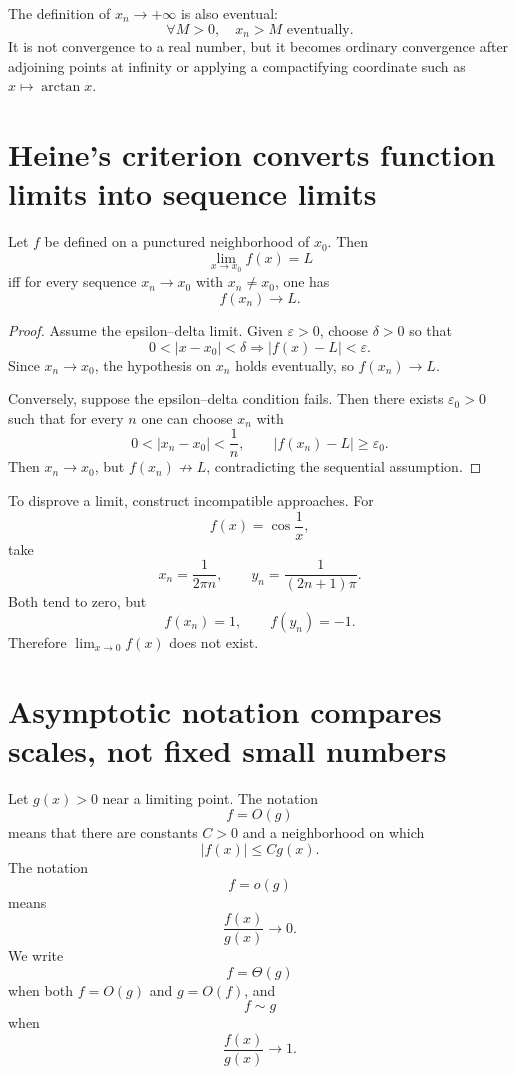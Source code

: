 The definition of \(x_n\to+\infty\) is also eventual:
\[
  \forall M>0,
  \quad
  x_n>M\text{ eventually}.
\]
It is not convergence to a real number, but it becomes ordinary convergence after adjoining points at infinity or applying a compactifying coordinate such as \(x\mapsto\arctan x\).

\section{Heine's criterion converts function limits into sequence limits}

\begin{theorem}
Let \(f\) be defined on a punctured neighborhood of \(x_0\).  Then
\[
  \lim_{x\to x_0}f(x)=L
\]
iff for every sequence \(x_n\to x_0\) with \(x_n\ne x_0\), one has
\[
  f(x_n)\to L.
\]
\end{theorem}

\begin{proof}
Assume the epsilon--delta limit.  Given \(\varepsilon>0\), choose \(\delta>0\) so that
\[
  0<|x-x_0|<\delta
  \Longrightarrow
  |f(x)-L|<\varepsilon.
\]
Since \(x_n\to x_0\), the hypothesis on \(x_n\) holds eventually, so \(f(x_n)\to L\).

Conversely, suppose the epsilon--delta condition fails.  Then there exists \(\varepsilon_0>0\) such that for every \(n\) one can choose \(x_n\) with
\[
  0<|x_n-x_0|<\frac1n,
  \qquad
  |f(x_n)-L|\ge\varepsilon_0.
\]
Then \(x_n\to x_0\), but \(f(x_n)\not\to L\), contradicting the sequential assumption.
\end{proof}

To disprove a limit, construct incompatible approaches.  For
\[
  f(x)=\cos\frac1x,
\]
take
\[
  x_n=\frac1{2\pi n},
  \qquad
  y_n=\frac1{(2n+1)\pi}.
\]
Both tend to zero, but
\[
  f(x_n)=1,
  \qquad
  f(y_n)=-1.
\]
Therefore \(\lim_{x\to0}f(x)\) does not exist.

\section{Asymptotic notation compares scales, not fixed small numbers}

Let \(g(x)>0\) near a limiting point.  The notation
\[
  f=O(g)
\]
means that there are constants \(C>0\) and a neighborhood on which
\[
  |f(x)|\le Cg(x).
\]
The notation
\[
  f=o(g)
\]
means
\[
  \frac{f(x)}{g(x)}\to0.
\]
We write
\[
  f=\Theta(g)
\]
when both \(f=O(g)\) and \(g=O(f)\), and
\[
  f\sim g
\]
when
\[
  \frac{f(x)}{g(x)}\to1.
\]

